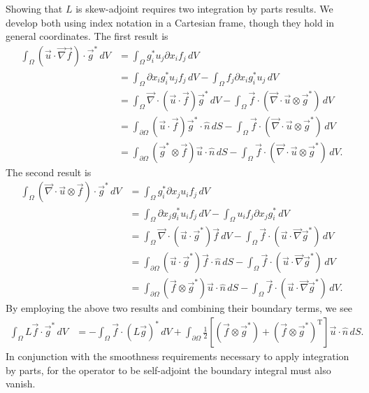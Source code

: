 \documentclass[letterpaper,reqno,11pt]{amsart}
\newcommand{\vecnabla}{\ensuremath{\vec{\nabla}}}
\begin{document}
Showing that $L$ is skew-adjoint requires two integration by parts results.
We develop both using index notation in a Cartesian frame, though they
hold in general coordinates.  The first result is
\begin{align}
  \int_{\Omega}
    \left(\vec{u}\cdot\vecnabla\vec{f}\right)\cdot{}\vec{g}^{\ast}
    \,d\!V
  &=
  \int_{\Omega} g_i^{\ast} u_j \partial\!x_{i} f_j \,d\!V
  \\
  &=
    \int_{\Omega} \partial\!x_{i} g_i^{\ast} u_j f_j \,d\!V
  - \int_{\Omega} f_j \partial\!x_{i} g_i^{\ast} u_j \,d\!V
  \\
  &=
    \int_{\Omega}
      \vecnabla\cdot\left(\vec{u}\cdot\vec{f}\right)\vec{g}^{\ast}
      \,d\!V
  - \int_{\Omega}
      \vec{f}\cdot\left(\vecnabla\cdot\vec{u}\otimes\vec{g}^{\ast}\right)
      \,d\!V
  \\
  &=
    \int_{\partial\Omega}
      \left(\vec{u}\cdot\vec{f}\right)\vec{g}^{\ast}\cdot\hat{n}
      \,d\!S
  - \int_{\Omega}
      \vec{f}\cdot\left(\vecnabla\cdot\vec{u}\otimes\vec{g}^{\ast}\right)
      \,d\!V
  \\
  &=
    \int_{\partial\Omega}
      \left(\vec{g}^{\ast}\otimes\vec{f}\right)\vec{u}\cdot\hat{n}
      \,d\!S
  - \int_{\Omega}
      \vec{f}\cdot\left(\vecnabla\cdot\vec{u}\otimes\vec{g}^{\ast}\right)
      \,d\!V
  .
\end{align}
The second result is
\begin{align}
  \int_{\Omega}
    \left(\vecnabla\cdot\vec{u}\otimes\vec{f}\right)\cdot\vec{g}^{\ast}
    \,d\!V
  &=
  \int_{\Omega} g_i^{\ast} \partial\!x_{j} u_i f_j \,d\!V
  \\
  &=
    \int_{\Omega} \partial\!x_{j} g_i^{\ast} u_i f_j \,d\!V
  - \int_{\Omega} u_i f_j \partial\!x_{j} g_i^{\ast} \,d\!V
  \\
  &=
    \int_{\Omega}
      \vecnabla\cdot\left(\vec{u}\cdot\vec{g}^{\ast}\right)\vec{f}
      \,d\!V
  - \int_{\Omega}
      \vec{f}\cdot\left(\vec{u}\cdot\vecnabla\vec{g}^{\ast}\right)
      \,d\!V
  \\
  &=
    \int_{\partial\Omega}
      \left(\vec{u}\cdot\vec{g}^{\ast}\right)\vec{f}\cdot\hat{n}
      \,d\!S
  - \int_{\Omega}
      \vec{f}\cdot\left(\vec{u}\cdot\vecnabla\vec{g}^{\ast}\right)
      \,d\!V
  \\
  &=
    \int_{\partial\Omega}
      \left(\vec{f}\otimes\vec{g}^{\ast}\right)\vec{u}\cdot\hat{n}
      \,d\!S
  - \int_{\Omega}
      \vec{f}\cdot\left(\vec{u}\cdot\vecnabla\vec{g}^{\ast}\right)
      \,d\!V
  .
\end{align}
By employing the above two results and combining their boundary terms, we see
\begin{align}
  \int_{\Omega} L\vec{f}\cdot\vec{g}^{\ast}\,d\!V
  &=
  - \int_{\Omega} \vec{f}\cdot{}\left(L\vec{g}\right)^{\ast} \,d\!V
  + \int_{\partial\Omega} \frac{1}{2}\left[
        \left(\vec{f}\otimes\vec{g}^{\ast}\right)
      + \left(\vec{f}\otimes\vec{g}^{\ast}\right)^{\mathrm{T}}
    \right] \vec{u}\cdot\hat{n} \,d\!S
  .
\end{align}
In conjunction with the smoothness requirements necessary to apply integration
by parts, for the operator to be self-adjoint the boundary integral must also
vanish.
\end{document}
